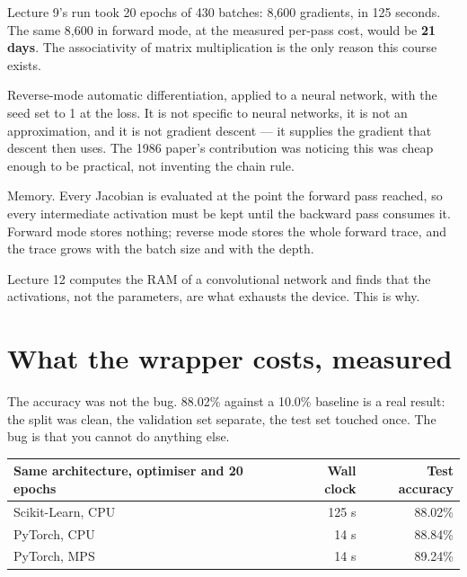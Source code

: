 \documentclass[11pt,a4paper]{article}
\begin{document}
Lecture 9's run took 20 epochs of 430 batches: 8{,}600 gradients, in 125
seconds. The same 8{,}600 in forward mode, at the measured per-pass cost, would
be \textbf{21 days}. The associativity of matrix multiplication is the only
reason this course exists.

\begin{keybox}[title={So what is backpropagation?}]
Reverse-mode automatic differentiation, applied to a neural network, with the
seed set to 1 at the loss. It is not specific to neural networks, it is not an
approximation, and it is not gradient descent --- it supplies the gradient that
descent then uses. The 1986 paper's contribution was noticing this was cheap
enough to be practical, not inventing the chain rule.
\end{keybox}

\begin{failbox}[title={What reverse mode costs}]
Memory. Every Jacobian is evaluated at the point the forward pass reached, so
every intermediate activation must be kept until the backward pass consumes it.
Forward mode stores nothing; reverse mode stores the whole forward trace, and
the trace grows with the batch size and with the depth.

Lecture 12 computes the RAM of a convolutional network and finds that the
activations, not the parameters, are what exhausts the device. This is why.
\end{failbox}

\section{What the wrapper costs, measured}

The accuracy was not the bug. 88.02\% against a 10.0\% baseline is a real
result: the split was clean, the validation set separate, the test set touched
once. The bug is that you cannot do anything else.

\begin{center}
\small
\begin{tabular}{lrr}
\toprule
\textbf{Same architecture, optimiser and 20 epochs} & \textbf{Wall clock} &
\textbf{Test accuracy} \\
\midrule
Scikit-Learn, CPU & 125 s & 88.02\% \\
PyTorch, CPU      &  14 s & 88.84\% \\
PyTorch, MPS      &  14 s & 89.24\% \\
\bottomrule
\end{tabular}
\end{center}
\end{document}
